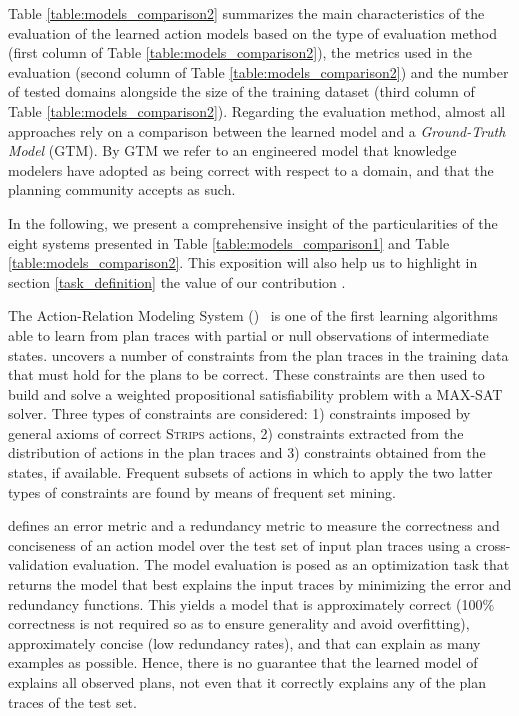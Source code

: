 Table \ref{table:models_comparison2} summarizes the main characteristics of the evaluation of the learned action models based on the type of evaluation method (first column of Table \ref{table:models_comparison2}), the metrics used in the evaluation (second column of Table \ref{table:models_comparison2}) and the number of tested domains alongside the size of the training dataset (third column of Table \ref{table:models_comparison2}). \textcolor[rgb]{1.00,0.00,0.00}{Regarding the evaluation method, almost all approaches rely on a comparison between the learned model and a {\em Ground-Truth Model} (GTM). By GTM we refer to an engineered model that knowledge modelers have adopted as being correct with respect to a domain, and that the planning community accepts as such.}

In the following, we present a comprehensive insight of the particularities of the eight systems presented in Table \ref{table:models_comparison1} and Table \ref{table:models_comparison2}. This exposition will also help us to highlight in section \ref{task_definition} the value of our contribution \FAMA.


\vspace{0.3cm}

The Action-Relation Modeling System (\textbf{\ARMS})~\cite{yang2007learning} is one of the first learning algorithms able to learn from plan traces with partial or null observations of intermediate states. \ARMS uncovers a number of constraints from the plan traces in the training data that must hold for the plans to be correct. These constraints are then used to build and solve a weighted propositional satisfiability problem with a MAX-SAT solver. Three types of constraints are considered: 1) constraints imposed by general axioms of correct \textsc{Strips} actions, 2) constraints extracted from the distribution of actions in the plan traces and 3) constraints obtained from the \PO states, if available. Frequent subsets of actions in which to apply the two latter types of constraints are found by means of frequent set mining.

\ARMS defines an error metric and a redundancy metric to measure the correctness and conciseness of an action model over the test set of input plan traces using a cross-validation evaluation. The model evaluation is posed as an optimization task that returns the model that best explains the input traces by minimizing the error and redundancy functions. This yields a model that is approximately correct (100\% correctness is not required so as to ensure generality and avoid overfitting), approximately concise (low redundancy rates), and that can explain as many examples as possible. Hence, there is no guarantee that the learned model of \ARMS explains all observed plans, not even that it correctly explains any of the plan traces of the test set.

